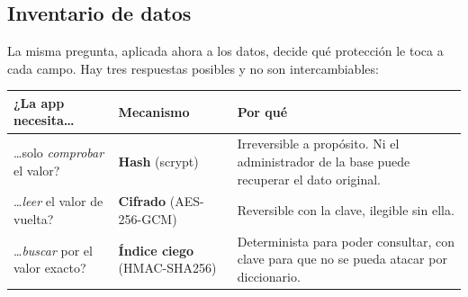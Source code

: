 \documentclass[11pt,letterpaper]{article}
\begin{document}
\subsection{Inventario de datos}
\label{sec:inventario-datos}

La misma pregunta, aplicada ahora a los datos, decide qué protección le toca a
cada campo. Hay tres respuestas posibles y no son intercambiables:

\begin{center}
\small
\begin{tabular}{@{}>{\raggedright\arraybackslash}p{3.9cm} >{\raggedright\arraybackslash}p{3.8cm} >{\raggedright\arraybackslash}p{7.0cm}@{}}
\toprule
\textbf{¿La app necesita\ldots} & \textbf{Mecanismo} & \textbf{Por qué} \\
\midrule
\ldots solo \emph{comprobar} el valor?
  & \textbf{Hash} (scrypt)
  & Irreversible a propósito. Ni el administrador de la base puede recuperar
    el dato original. \\[3pt]
\ldots \emph{leer} el valor de vuelta?
  & \textbf{Cifrado} (AES-256-GCM)
  & Reversible con la clave, ilegible sin ella. \\[3pt]
\ldots \emph{buscar} por el valor exacto?
  & \textbf{Índice ciego} (HMAC-SHA256)
  & Determinista para poder consultar, con clave para que no se pueda atacar
    por diccionario. \\
\bottomrule
\end{tabular}
\end{center}

\vspace{0.4em}
\end{document}

